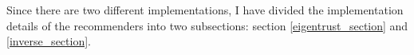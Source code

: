 	Since there are two different implementations, I have divided the implementation details of the recommenders into two subsections: section \ref{eigentrust_section} and \ref{inverse_section}.